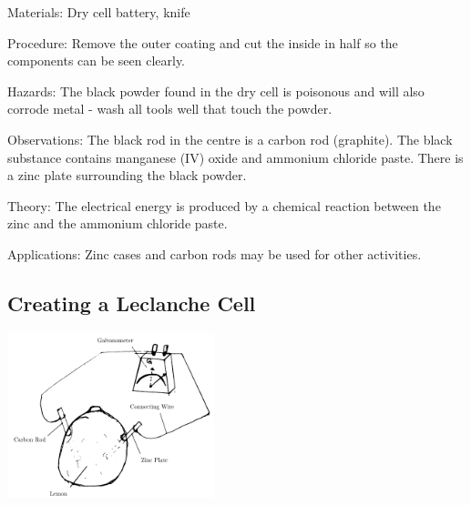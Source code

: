 \begin{multicols}{2}
\begin{description*}
\item[Materials:]{Dry cell battery, knife}
\item[Procedure:]{Remove the outer coating and cut the inside in half so the components can be seen clearly.}
\item[Hazards:]{The black powder found in the dry cell is poisonous and will also corrode metal - wash all tools well that touch the powder.}
\item[Observations:]{The black rod in the centre is a carbon rod (graphite). The black substance contains manganese (IV) oxide and ammonium chloride paste. There is a zinc plate surrounding the black powder.}
\item[Theory:]{The electrical energy is produced by a chemical reaction between the zinc and the ammonium chloride paste.}
\item[Applications:]{Zinc cases and carbon rods may be used for other activities.}
\end{description*}

\subsection{Creating a Leclanche Cell}

\begin{center}
\includegraphics[width=0.45\textwidth]{./img/lechlanche-cell.png}
\end{center}


\end{multicols}
